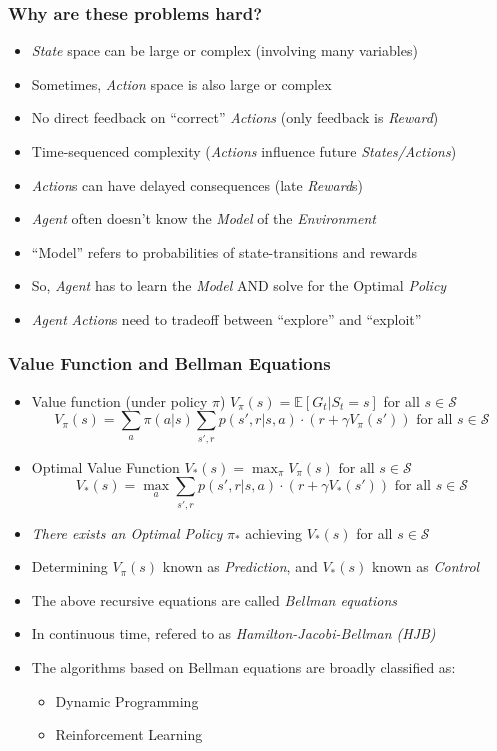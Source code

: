 \documentclass[handout]{beamer}
\begin{document}
\begin{frame}
\frametitle{Why are these problems hard?}
\pause
\begin{itemize}[<+->]
\item {\em State} space can be large or complex (involving many variables)
\item Sometimes, {\em Action} space is also large or complex
\item No direct feedback on ``correct'' {\em Actions} (only feedback is {\em Reward})
\item Time-sequenced complexity ({\em Actions} influence future {\em States/Actions})
\item {\em Action}s can have delayed consequences (late {\em Reward}s)
\item {\em Agent} often doesn't know the {\em Model} of the {\em Environment}
\item ``Model'' refers to probabilities of state-transitions and rewards
\item So, {\em Agent} has to learn the {\em Model} AND solve for the Optimal {\em Policy}
\item {\em Agent} {\em Action}s need to tradeoff between ``explore'' and ``exploit''
\end{itemize}
\end{frame}

\begin{frame}
\frametitle{Value Function and Bellman Equations}
\pause
\begin{itemize}
\item Value function (under policy $\pi$) $V_{\pi}(s) = \mathbb{E}[G_t|S_t = s]$ for all $s \in \mathcal{S}$
\pause
$$V_{\pi}(s) = \sum_{a} \pi(a|s) \sum_{s',r} p(s',r|s,a) \cdot (r + \gamma V_{\pi}(s')) \mbox{ for all } s \in \mathcal{S}$$
\pause
\item Optimal Value Function $V_{*}(s) = \max_{\pi} V_{\pi}(s) \mbox{ for all } s \in \mathcal{S}$
\pause
$$V_{*}(s) = \max_{a} \sum_{s',r} p(s',r|s,a) \cdot (r + \gamma V_{*}(s')) \mbox{ for all } s \in \mathcal{S}$$
\pause
\item {\em There exists an Optimal Policy} $\pi_{*}$ achieving $V_{*}(s)$ for all $s \in \mathcal{S}$
\pause
\item Determining $V_{\pi}(s)$ known as {\em Prediction}, and $V_{*}(s)$ known as {\em Control}
\pause
\item The above recursive equations are called {\em Bellman equations}
\pause
\item In continuous time, refered to as {\em Hamilton-Jacobi-Bellman (HJB)}
\pause
\item The algorithms based on Bellman equations are broadly classified as:
\begin{itemize}
\item Dynamic Programming
\item Reinforcement Learning
\end{itemize}

\end{itemize}
\end{frame}
\end{document}
